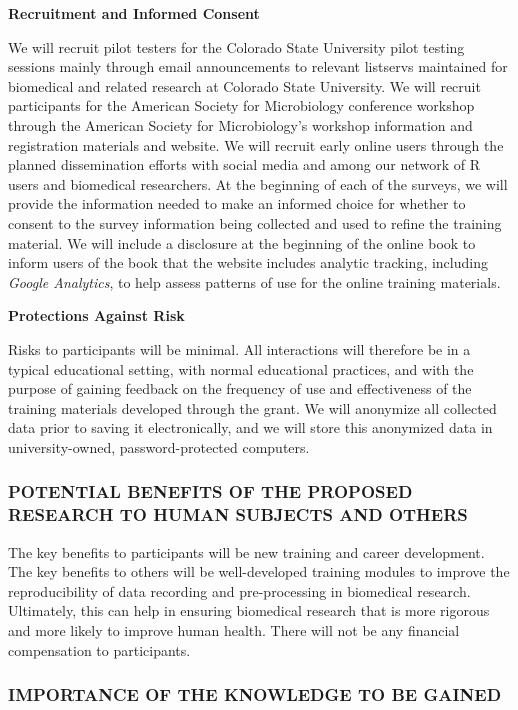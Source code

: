\documentclass[pdftex,english,11.5pt,parskip=half]{scrartcl}
\begin{document}
\textbf{Recruitment and Informed Consent}

We will recruit pilot testers for the Colorado State University pilot testing sessions mainly through email announcements to relevant listservs maintained for biomedical and related research at Colorado State University. We will recruit participants for the American Society for Microbiology conference workshop through the American Society for Microbiology's workshop information and registration materials and website. We will recruit early online users through the planned dissemination efforts with social media and among our network of R users and biomedical researchers. At the beginning of each of the surveys, we will provide the information needed to make an
informed choice for whether to consent to the survey information being collected and
used to refine the training material. We will include a disclosure at the beginning of 
the online book to inform users of the book that the website includes analytic 
tracking, including \textit{Google Analytics}, to help assess patterns of use for the 
online training materials.

\textbf{Protections Against Risk}

Risks to participants will be minimal. 
All interactions will therefore be in a typical educational setting, with normal educational practices, and with the purpose of gaining feedback on the frequency of use and effectiveness of the training materials developed through the grant.
We will anonymize all collected data prior to saving it electronically, and we will 
store this anonymized data in university-owned, password-protected computers.

\subsubsection*{POTENTIAL BENEFITS OF THE PROPOSED RESEARCH TO HUMAN SUBJECTS AND OTHERS}

The key benefits to participants will be new training and career development. The 
key benefits to others will be well-developed training modules to improve the 
reproducibility of data recording and pre-processing in biomedical research. 
Ultimately, this can help in ensuring biomedical research that is more 
rigorous and more likely to improve human health. There will not be any 
financial compensation to participants.

\subsubsection*{IMPORTANCE OF THE KNOWLEDGE TO BE GAINED}
\end{document}

